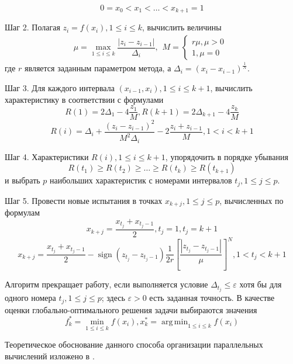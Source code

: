 \documentclass[a4paper]{article}
\DeclareMathOperator*{\argmin}{arg\,min}
\DeclareMathOperator{\sign}{sign}
\begin{document}
\begin{displaymath}
0=x_0<x_1<\dotsc<x_{k+1}=1
\end{displaymath}
\par
Шаг 2. Полагая \(z_i=f(x_i),1\leqslant i\leqslant k\), вычислить величины 
\begin{equation}
\label{step2}
\mu=\max_{1\leqslant i\leqslant k}\dfrac{|z_i-z_{i-1}|}{\Delta_i},
\begin{matrix}
    M = 
    \left\{
    \begin{matrix}
    r\mu,\mu>0 \\
    1,\mu=0
    \end{matrix} \right.
    \end{matrix}
\end{equation}
где \(r\) является заданным параметром метода, а \(\Delta_i=(x_i-x_{i-1})^\frac{1}{N}\).
\par
Шаг 3. Для каждого интервала \((x_{i-1},x_i),1\leqslant i\leqslant k+1\), вычислить характеристику в соответствии с формулами
\begin{equation}
\label{step3_1}
R(1)=2\Delta_1-4\dfrac{z_1}{M},R(k+1)=2\Delta_{k+1}-4\dfrac{z_k}{M}
\end{equation}
\begin{equation}
\label{step3_2}
R(i)=\Delta_i+\dfrac{(z_i-z_{i-1})^2}{M^2\Delta_i}-2\dfrac{z_i+z_{i-1}}{M},1<i<k+1
\end{equation}
\par
Шаг 4. Характеристики \(R(i),1\leqslant i\leqslant k+1\), упорядочить в порядке убывания 
\begin{equation}
\label{step4}
R(t_1)\geqslant R(t_2)\geqslant \dots \geqslant R(t_{k})\geqslant R(t_{k+1})
\end{equation}
и выбрать \(p\) наибольших характеристик с номерами интервалов \(t_j,1\leqslant j\leqslant p\).
\par
Шаг 5. Провести новые испытания в точках \(x_{k+j},1\leqslant j\leqslant p\), вычисленных по формулам
\begin{displaymath}
x_{k+j}=\dfrac{x_{t_j}+x_{t_j-1}}{2},t_j=1,t_j=k+1
\end{displaymath}
\begin{equation}
\label{step5}
x_{k+j}=\dfrac{x_{t_j}+x_{t_j-1}}{2}-\sign(z_{t_j}-z_{t_j-1})\dfrac{1}{2r}\left[\dfrac{|z_{t_j}-z_{t_j-1}|}{\mu}\right]^N,1<t_j<k+1
\end{equation}
\par
Алгоритм прекращает работу, если выполняется условие \(\Delta_{t_j}\leqslant \varepsilon\) хотя бы для одного номера \(t_j,1\leqslant j\leqslant p\); здесь \(\varepsilon>0\) есть заданная точность. В качестве оценки глобально-оптимального решения задачи  выбираются значения
\begin{equation}
f_k^*=\min_{1\leqslant i \leqslant k}f(x_i), x_k^*=\argmin_{1\leqslant i \leqslant k}f(x_i)
\end{equation}
\par
Теоретическое обоснование данного способа организации параллельных вычислений изложено в \cite{strGergrParOptBook}.
\end{document}
